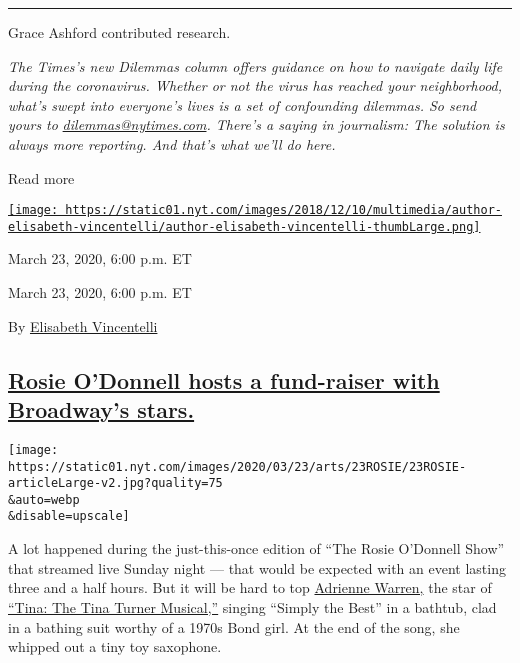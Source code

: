 \begin{center}\rule{0.5\linewidth}{\linethickness}\end{center}

Grace Ashford contributed research.

\emph{The Times's new Dilemmas column offers guidance on how to navigate
daily life during the coronavirus. Whether or not the virus has reached
your neighborhood, what's swept into everyone's lives is a set of
confounding dilemmas. So send yours to}
\href{mailto:dilemmas@nytimes.com}{\emph{dilemmas@nytimes.com}}\emph{.
There's a saying in journalism: The solution is always more reporting.
And that's what we'll do here.}

Read more

\href{https://www.nytimes.com/by/elisabeth-vincentelli}{\texttt{[image: https://static01.nyt.com/images/2018/12/10/multimedia/author-elisabeth-vincentelli/author-elisabeth-vincentelli-thumbLarge.png]}}

March 23, 2020, 6:00 p.m. ET

March 23, 2020, 6:00 p.m. ET

By \href{https://www.nytimes.com/by/elisabeth-vincentelli}{Elisabeth
Vincentelli}

\hypertarget{rosie-odonnell-hosts-a-fund-raiser-with-broadways-stars}{%
\subsection{\texorpdfstring{\protect\hyperlink{rosie-odonnell-hosts-a-fund-raiser-with-broadways-stars}{Rosie
O'Donnell hosts a fund-raiser with Broadway's
stars.}}{Rosie O'Donnell hosts a fund-raiser with Broadway's stars.}}\label{rosie-odonnell-hosts-a-fund-raiser-with-broadways-stars}}

\texttt{[image: https://static01.nyt.com/images/2020/03/23/arts/23ROSIE/23ROSIE-articleLarge-v2.jpg?quality=75\\\&auto=webp\\\&disable=upscale]}

A lot happened during the just-this-once edition of ``The Rosie
O'Donnell Show'' that streamed live Sunday night --- that would be
expected with an event lasting three and a half hours. But it will be
hard to top
\href{https://www.nytimes.com/2019/10/30/theater/adrienne-warren-tina-turner-broadway-musical.html?searchResultPosition=2}{Adrienne
Warren,} the star of
\href{https://www.nytimes.com/2019/11/07/theater/tina-turner-musical-review.html?searchResultPosition=1}{``Tina:
The Tina Turner Musical,''} singing ``Simply the Best'' in a bathtub,
clad in a bathing suit worthy of a 1970s Bond girl. At the end of the
song, she whipped out a tiny toy saxophone.

